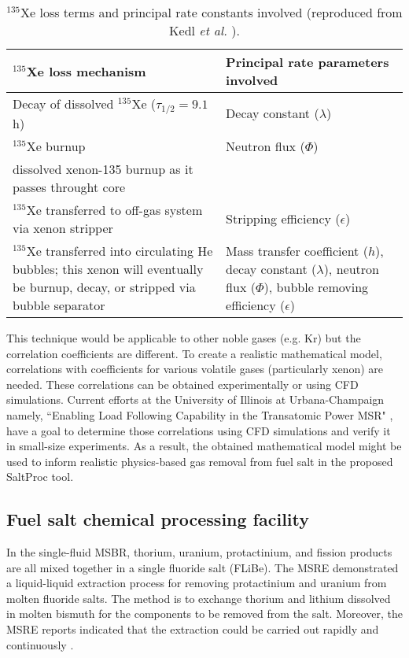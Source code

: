 \begin{table}[ht!]
\caption{$^{135}$Xe loss terms and principal rate constants involved
 (reproduced from Kedl \emph{et al.} \cite{kedl_development_1967}).}
  \centering
\begin{tabularx}{\textwidth}{b | b}
\hline \textbf{$^{135}$Xe loss mechanism}      & \textbf{Principal rate 
parameters involved}  	\\
\hline Decay of dissolved $^{135}$Xe ($\tau_{1/2}=9.1$ h)  & Decay constant	($\lambda$)		\\
\hline $^{135}$Xe burnup              &  Neutron flux ($\Phi$)		 					\\
dissolved xenon-135 burnup as it passes throught core  & 			            \\		\hline $^{135}$Xe transferred to off-gas system via xenon stripper & Stripping efficiency ($\epsilon$)		\\
\hline $^{135}$Xe transferred into circulating He bubbles; this xenon will eventually be burnup, decay, or stripped via bubble separator & Mass transfer coefficient ($h$), decay constant ($\lambda$), 
neutron flux ($\Phi$), bubble removing efficiency ($\epsilon$)		\\
\hline 
\end{tabularx}
  		\label{tab:xe_loss}
\end{table}

This technique would be applicable to other noble gases (e.g. Kr) but the 
correlation coefficients are different. 
To create a realistic mathematical model, correlations with 
coefficients for various volatile gases (particularly xenon) are needed. These 
correlations can be obtained experimentally or using CFD simulations. 
Current efforts at the University of Illinois at Urbana-Champaign namely, ``Enabling 
Load Following Capability in the Transatomic Power MSR" \cite{huff_enabling_2018}, 
have a goal to determine those correlations using CFD simulations 
and verify it in small-size experiments. 
As a result, the obtained mathematical model might be used to inform realistic 
physics-based gas removal from fuel salt in the proposed SaltProc tool.

\subsection{Fuel salt chemical processing facility} \label{sec:chemical_processing}
In the single-fluid \gls{MSBR}, thorium, uranium, 
protactinium, and fission products are all mixed together in a single fluoride salt (FLiBe). The \gls{MSRE} demonstrated a liquid-liquid extraction process 
for removing protactinium and uranium from molten fluoride salts. The method 
is to exchange thorium and lithium dissolved in molten bismuth for the 
components to be removed from the salt. Moreover, the \gls{MSRE} reports 
indicated that the extraction could be carried out rapidly and continuously 
\cite{whatley_engineering_1970-1}.

